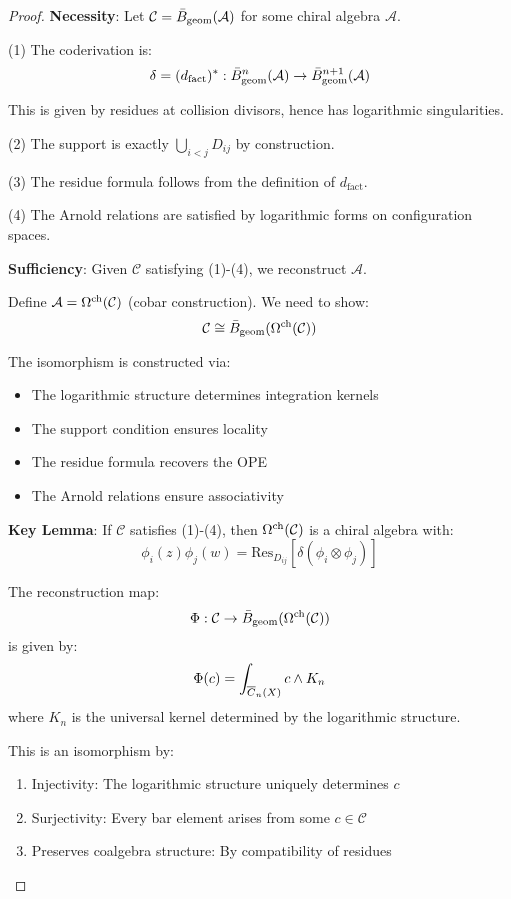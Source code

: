 \begin{proof}
\textbf{Necessity}: Let $\mathcal{C} = \bar{B}_{\text{geom}}(\mathcal{A})$ for some chiral algebra $\mathcal{A}$.

(1) The coderivation is:
$$\delta = (d_{\text{fact}})^*: \bar{B}_{\text{geom}}^n(\mathcal{A}) \to \bar{B}_{\text{geom}}^{n+1}(\mathcal{A})$$

This is given by residues at collision divisors, hence has logarithmic singularities.

(2) The support is exactly $\bigcup_{i<j} D_{ij}$ by construction.

(3) The residue formula follows from the definition of $d_{\text{fact}}$.

(4) The Arnold relations are satisfied by logarithmic forms on configuration spaces.

\textbf{Sufficiency}: Given $\mathcal{C}$ satisfying (1)-(4), we reconstruct $\mathcal{A}$.

Define $\mathcal{A} = \Omega^{\text{ch}}(\mathcal{C})$ (cobar construction). We need to show:
$$\mathcal{C} \cong \bar{B}_{\text{geom}}(\Omega^{\text{ch}}(\mathcal{C}))$$

The isomorphism is constructed via:
\begin{itemize}
\item The logarithmic structure determines integration kernels
\item The support condition ensures locality
\item The residue formula recovers the OPE
\item The Arnold relations ensure associativity
\end{itemize}

\textbf{Key Lemma}: If $\mathcal{C}$ satisfies (1)-(4), then $\Omega^{\text{ch}}(\mathcal{C})$ is a chiral algebra with:
$$\phi_i(z)\phi_j(w) = \text{Res}_{D_{ij}}[\delta(\phi_i \otimes \phi_j)]$$

The reconstruction map:
$$\Phi: \mathcal{C} \to \bar{B}_{\text{geom}}(\Omega^{\text{ch}}(\mathcal{C}))$$
is given by:
$$\Phi(c) = \int_{\overline{C}_{n}(X)} c \wedge K_n$$
where $K_n$ is the universal kernel determined by the logarithmic structure.

This is an isomorphism by:
\begin{enumerate}
\item Injectivity: The logarithmic structure uniquely determines $c$
\item Surjectivity: Every bar element arises from some $c \in \mathcal{C}$
\item Preserves coalgebra structure: By compatibility of residues
\end{enumerate}
\end{proof}

